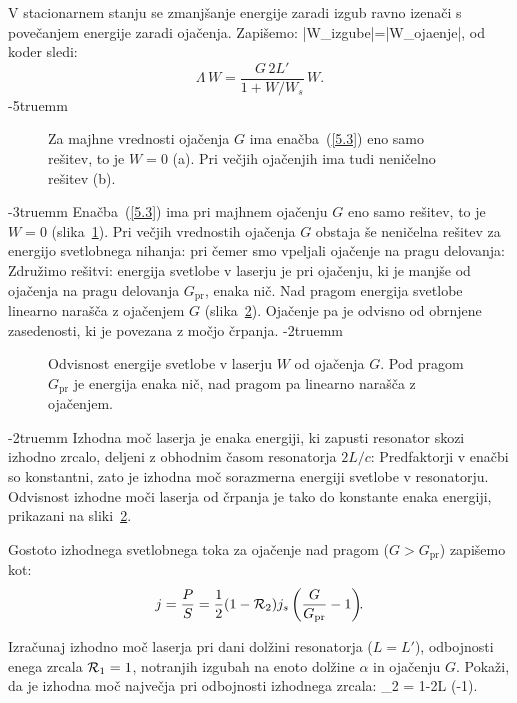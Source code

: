 V stacionarnem stanju se zmanjšanje energije zaradi izgub ravno izenači 
s povečanjem energije zaradi ojačenja. Zapišemo:
\beq
|\Delta W_{\rm izgube}|=|\Delta W_{\rm ojaenje}|,
\eeq
od koder sledi:
\begin{equation}  
\Lambda\, W=\frac{G\,2L'}{1+W/W_s}\,W.
\label{5.3}
\end{equation}
\vglue-5truemm
\begin{figure}[ht]
\centering
\def\svgwidth{110truemm} 

\caption{Za majhne vrednosti ojačenja $G$ ima enačba~(\ref{5.3}) eno samo 
rešitev, to je $W=0$ (a). Pri večjih ojačenjih ima tudi neničelno rešitev (b).}
\label{fig:stacio}
\end{figure}
\vglue-3truemm
Enačba~(\ref{5.3}) ima pri majhnem ojačenju $G$ eno samo rešitev, to je 
$W=0$ (slika~\ref{fig:stacio}). Pri večjih vrednostih ojačenja $G$ obstaja še neničelna rešitev
za energijo svetlobnega nihanja:
pri čemer smo vpeljali ojačenje na pragu delovanja:
Združimo rešitvi: energija svetlobe v laserju je pri ojačenju, ki je manjše
od ojačenja na pragu delovanja $G_\mathrm{pr}$, enaka
nič. Nad pragom energija svetlobe linearno narašča z ojačenjem $G$ (slika~\ref{fig:energija}).
Ojačenje pa je odvisno od obrnjene zasedenosti, ki je povezana
z močjo črpanja.
\vglue-2truemm
\begin{figure}[ht]
\centering
\def\svgwidth{60truemm} 

\caption{Odvisnost energije svetlobe v laserju $W$ od ojačenja $G$. 
Pod pragom $G_\mathrm{pr}$ je energija enaka nič, 
nad pragom pa linearno narašča z ojačenjem.}
\label{fig:energija}
\end{figure}
\vglue-2truemm
Izhodna moč laserja je enaka energiji, ki zapusti
resonator skozi izhodno zrcalo, deljeni z obhodnim časom resonatorja $2L/c$:
Predfaktorji v enačbi so konstantni, zato je izhodna moč sorazmerna
energiji svetlobe v resonatorju. Odvisnost izhodne moči laserja od črpanja je 
tako do konstante enaka energiji, prikazani na sliki~\ref{fig:energija}. 

Gostoto izhodnega svetlobnega toka za ojačenje nad pragom ($G>G_\mathrm{pr}$) 
zapišemo kot: 
\begin{equation}
 j = \frac{P}{S} = \frac{1}{2} (1-{\cal {R}}_{2}) j_s \left(\frac{G}{G_\mathrm{pr}}-1\right)\!\!.
\end{equation}
\begin{naloga}
Izračunaj izhodno moč laserja pri dani dolžini resonatorja ($L=L'$), 
odbojnosti enega zrcala ${\cal {R}}_{1}=1$, 
notranjih izgubah na enoto dolžine $\alpha$ in ojačenju $G$. Pokaži, da
je izhodna moč največja pri odbojnosti izhodnega zrcala: 
\beq
{}_2 = 1-2\alpha L \left(-1\right)\!\!.
\eeq
\end{naloga}

